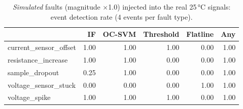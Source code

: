 \begin{table}[htbp]\centering\footnotesize
\begin{tabular}{lrrrrr}
\toprule
 & IF & OC-SVM & Threshold & Flatline & Any \\
\midrule
current\_sensor\_offset & 1.00 & 1.00 & 1.00 & 0.00 & 1.00 \\
resistance\_increase & 1.00 & 1.00 & 0.00 & 0.00 & 1.00 \\
sample\_dropout & 0.25 & 1.00 & 0.00 & 0.00 & 1.00 \\
voltage\_sensor\_stuck & 0.00 & 0.00 & 0.00 & 1.00 & 1.00 \\
voltage\_spike & 1.00 & 1.00 & 1.00 & 0.00 & 1.00 \\
\bottomrule
\end{tabular}
\caption{\emph{Simulated} faults (magnitude $\times$1.0) injected into the real 25\,°C signals: event detection rate (4 events per fault type).}\label{tab:faultsim10}
\end{table}
